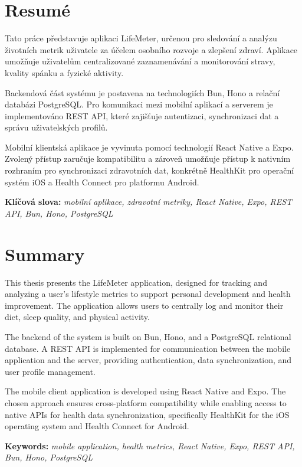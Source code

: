 \newpage
\thispagestyle{empty}

\section*{Resumé}
Tato práce představuje aplikaci LifeMeter, určenou pro sledování a analýzu životních metrik uživatele za účelem osobního rozvoje a zlepšení zdraví. Aplikace umožňuje uživatelům centralizované zaznamenávání a monitorování stravy, kvality spánku a fyzické aktivity.

Backendová část systému je postavena na technologiích Bun, Hono a relační databázi PostgreSQL. Pro komunikaci mezi mobilní aplikací a serverem je implementováno REST API, které zajišťuje autentizaci, synchronizaci dat a správu uživatelských profilů.

Mobilní klientská aplikace je vyvinuta pomocí technologií React Native a Expo. Zvolený přístup zaručuje kompatibilitu a zároveň umožňuje přístup k nativním rozhraním pro synchronizaci zdravotních dat, konkrétně HealthKit pro operační systém iOS a Health Connect pro platformu Android.

\bigskip
\noindent\textbf{Klíčová slova:}
\textit{mobilní aplikace, zdravotní metriky, React Native, Expo, REST API, Bun, Hono, PostgreSQL}

\section*{Summary}
This thesis presents the LifeMeter application, designed for tracking and analyzing a user's lifestyle metrics to support personal development and health improvement. The application allows users to centrally log and monitor their diet, sleep quality, and physical activity.

The backend of the system is built on Bun, Hono, and a PostgreSQL relational database. A REST API is implemented for communication between the mobile application and the server, providing authentication, data synchronization, and user profile management.

The mobile client application is developed using React Native and Expo. The chosen approach ensures cross-platform compatibility while enabling access to native APIs for health data synchronization, specifically HealthKit for the iOS operating system and Health Connect for Android.

\bigskip
\noindent\textbf{Keywords:}
\textit{mobile application, health metrics, React Native, Expo, REST API, Bun, Hono, PostgreSQL}